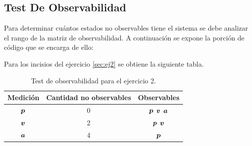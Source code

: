 	\subsection{Test De Observabilidad}
		Para determinar cuántos estados no observables tiene el sistema se debe analizar el rango de la 
		matriz de observabilidad. A continuación se expone la porción de código que se encarga de ello:
		

		Para los incisios del ejercicio \ref{sec:ej2} se obtiene la siguiente tabla.
		\begin{table}[h!]
			\centering
			\begin{tabular}{ccc}
				\toprule
				Medición	& Cantidad no observables	& Observables\\
				\midrule
				$\boldsymbol{p}$	& 0				& $\boldsymbol{p}$ $\boldsymbol{v}$ $\boldsymbol{a}$\\
				$\boldsymbol{v}$	& 2				& $\boldsymbol{p}$ $\boldsymbol{v}$ \\
				$\boldsymbol{a}$	& 4				& $\boldsymbol{p}$\\

				\bottomrule
			\end{tabular}
				\caption{Test de observabilidad para el ejercicio 2.}
				\label{tab:obs_ej2}
		\end{table}
%	
%	
